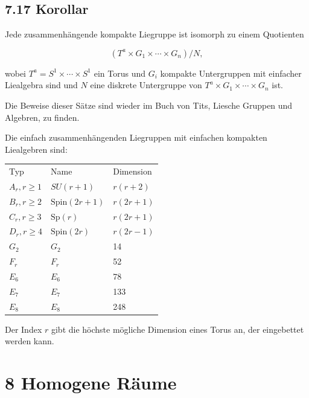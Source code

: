\documentclass[10pt, letterpaper]{article}
\begin{document}
\subsection*{7.17 Korollar}
Jede zusammenhängende kompakte Liegruppe ist isomorph zu einem Quotienten

$$
\left(T^{a} \times G_{1} \times \cdots \times G_{n}\right) / N,
$$

wobei $T^{a}=S^{1} \times \cdots \times S^{1}$ ein Torus und $G_{i}$ kompakte Untergruppen mit einfacher Liealgebra sind und $N$ eine diskrete Untergruppe von $T^{a} \times G_{1} \times \cdots \times G_{n}$ ist.

Die Beweise dieser Sätze sind wieder im Buch von Tits, Liesche Gruppen und Algebren, zu finden.

Die einfach zusammenhängenden Liegruppen mit einfachen kompakten Liealgebren sind:

\begin{center}
\begin{tabular}{lll}
Typ & Name & Dimension \\
$A_{r}, r \geq 1$ & $S U(r+1)$ & $r(r+2)$ \\
$B_{r}, r \geq 2$ & $\mathrm{Spin}(2 r+1)$ & $r(2 r+1)$ \\
$C_{r}, r \geq 3$ & $\mathrm{Sp}(r)$ & $r(2 r+1)$ \\
$D_{r}, r \geq 4$ & $\mathrm{Spin}(2 r)$ & $r(2 r-1)$ \\
$G_{2}$ & $G_{2}$ & 14 \\
$F_{r}$ & $F_{r}$ & 52 \\
$E_{6}$ & $E_{6}$ & 78 \\
$E_{7}$ & $E_{7}$ & 133 \\
$E_{8}$ & $E_{8}$ & 248 \\
\end{tabular}
\end{center}

Der Index $r$ gibt die höchste mögliche Dimension eines Torus an, der eingebettet werden kann.

\pagebreak


\section{8 Homogene Räume}
\end{document}
